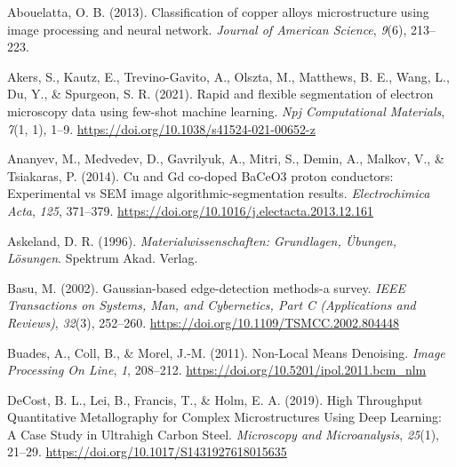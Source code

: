 \documentclass[
  12pt,
]{book}
\newlength{\cslhangindent}
\newlength{\cslentryspacingunit} %
\newenvironment{CSLReferences}[2] %
 {%
  \setlength{\parindent}{0pt}
  \ifodd #1
  \let\oldpar\par
  \def\par{\hangindent=\cslhangindent\oldpar}
  \fi
  \setlength{\parskip}{#2\cslentryspacingunit}
 }%
 {}
\begin{document}
\hypertarget{refs}{}
\begin{CSLReferences}{1}{0}
\leavevmode{}%
Abouelatta, O. B. (2013). Classification of copper alloys microstructure using image processing and neural network. \emph{Journal of American Science}, \emph{9}(6), 213--223.

\leavevmode{}%
Akers, S., Kautz, E., Trevino-Gavito, A., Olszta, M., Matthews, B. E., Wang, L., Du, Y., \& Spurgeon, S. R. (2021). Rapid and flexible segmentation of electron microscopy data using few-shot machine learning. \emph{Npj Computational Materials}, \emph{7}(1, 1), 1--9. \url{https://doi.org/10.1038/s41524-021-00652-z}

\leavevmode{}%
Ananyev, M., Medvedev, D., Gavrilyuk, A., Mitri, S., Demin, A., Malkov, V., \& Tsiakaras, P. (2014). Cu and {Gd} co-doped {BaCeO3} proton conductors: {Experimental} vs {SEM} image algorithmic-segmentation results. \emph{Electrochimica Acta}, \emph{125}, 371--379. \url{https://doi.org/10.1016/j.electacta.2013.12.161}

\leavevmode{}%
Askeland, D. R. (1996). \emph{Materialwissenschaften: {Grundlagen}, {Übungen}, {Lösungen}}. {Spektrum Akad. Verlag}.

\leavevmode{}%
Basu, M. (2002). Gaussian-based edge-detection methods-a survey. \emph{IEEE Transactions on Systems, Man, and Cybernetics, Part C (Applications and Reviews)}, \emph{32}(3), 252--260. \url{https://doi.org/10.1109/TSMCC.2002.804448}

\leavevmode{}%
Buades, A., Coll, B., \& Morel, J.-M. (2011). Non-{Local Means Denoising}. \emph{Image Processing On Line}, \emph{1}, 208--212. \url{https://doi.org/10.5201/ipol.2011.bcm_nlm}

\leavevmode{}%
DeCost, B. L., Lei, B., Francis, T., \& Holm, E. A. (2019). High {Throughput Quantitative Metallography} for {Complex Microstructures Using Deep Learning}: {A Case Study} in {Ultrahigh Carbon Steel}. \emph{Microscopy and Microanalysis}, \emph{25}(1), 21--29. \url{https://doi.org/10.1017/S1431927618015635}


\end{CSLReferences}
\end{document}

